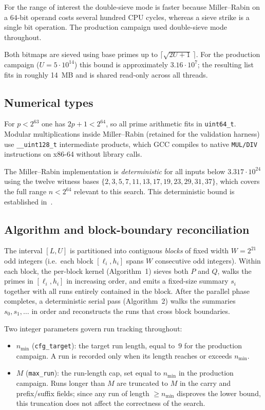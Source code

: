 \documentclass[11pt,a4paper]{article}
\theoremstyle{definition}
\begin{document}
For the range of interest the double-sieve mode is faster because
Miller--Rabin on a $64$-bit operand costs several hundred CPU cycles,
whereas a sieve strike is a single bit operation. The production
campaign used double-sieve mode throughout.

Both bitmaps are sieved using base primes up to
$\lceil\sqrt{2U+1}\,\rceil$. For the production campaign
($U = 5\cdot 10^{14}$) this bound is approximately $3.16\cdot 10^7$;
the resulting list fits in roughly 14~MB and is shared read-only across
all threads.

\subsection{Numerical types}
\label{sec:numerical-types}

For $p < 2^{63}$ one has $2p+1 < 2^{64}$, so all prime arithmetic fits in
\texttt{uint64\_t}. Modular multiplications inside Miller--Rabin
(retained for the validation harness) use \texttt{\_\_uint128\_t}
intermediate products, which GCC compiles to native \texttt{MUL/DIV}
instructions on x86-64 without library calls.

The Miller--Rabin implementation is \emph{deterministic} for all inputs
below $3.317\cdot 10^{24}$ using the twelve witness bases
$\{2, 3, 5, 7, 11, 13, 17, 19, 23, 29, 31, 37\}$, which covers the
full range $n < 2^{64}$ relevant to this search. This
deterministic bound is established in~\cite{mr-deterministic}.

\subsection{Algorithm and block-boundary reconciliation}
\label{sec:algorithm}

The interval $[L,U]$ is partitioned into contiguous \emph{blocks} of fixed
width $W = 2^{21}$ odd integers (i.e.\ each block $[\ell_i, h_i]$ spans
$W$ consecutive odd integers). Within each block, the per-block kernel
(Algorithm~1) sieves both $P$ and $Q$, walks the primes in $[\ell_i, h_i]$
in increasing order, and emits a fixed-size summary $s_i$ together with all
runs entirely contained in the block. After the parallel phase
completes, a deterministic serial pass (Algorithm~2) walks the
summaries $s_0, s_1, \ldots$ in order and reconstructs the runs that
cross block boundaries.

Two integer parameters govern run tracking throughout:
\begin{itemize}
\item $n_{\min}$ (\texttt{cfg\_target}): the target run length, equal
to~$9$ for the production campaign. A run is recorded only when its
length reaches or exceeds $n_{\min}$.
\item $M$ (\texttt{max\_run}): the run-length cap, set equal to
$n_{\min}$ in the production campaign. Runs longer than $M$ are
truncated to $M$ in the carry and prefix/suffix fields; since any run
of length $\ge n_{\min}$ disproves the lower bound, this truncation
does not affect the correctness of the search.
\end{itemize}
\end{document}
